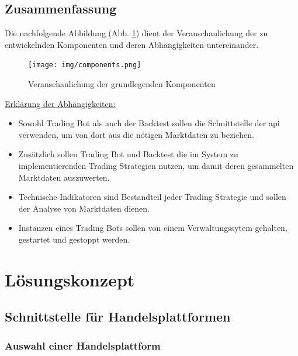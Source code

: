 \documentclass[oneside]{ausarbeitung}
\begin{document}

\section{Zusammenfassung}
\label{sec:zsmf_komponenten}

Die nachfolgende Abbildung (Abb. \ref{fig:7}) dient der
Veranschaulichung der zu entwickelnden Komponenten und deren
Abhängigkeiten untereinander.

\begin{figure}[H]
  \centering
  \texttt{[image: img/components.png]}
  \caption{Veranschaulichung der grundlegenden Komponenten}
  \label{fig:7}
\end{figure}

\underline{Erklärung der Abhängigkeiten:}
\begin{itemize}
	\item Sowohl Trading Bot als auch der Backtest sollen die Schnittstelle der
		\ac{api} verwenden, um von dort aus die nötigen Marktdaten zu beziehen.
	\item Zusätzlich sollen Trading Bot und Backtest die im System
		zu implementierenden Trading Strategien nutzen, um damit deren gesammelten 
		Marktdaten auszuwerten.
	\item Technische Indikatoren sind Bestandteil jeder Trading Strategie und
		sollen der Analyse von Marktdaten dienen.
	\item Instanzen eines Trading Bots sollen von einem Verwaltungssytem gehalten,
		gestartet und gestoppt werden.
\end{itemize}

\chapter{Lösungskonzept}
\label{cha:loesungskonzept}


\section{Schnittstelle für Handelsplattformen}
\label{sec:schnittstelle_für_handelsplattformen}

\subsection{Auswahl einer Handelsplattform}
\label{sub:auswahl_einer_handelsplattform}
\end{document}
